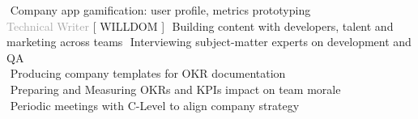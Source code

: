 \begin{cvtable}
{     \textperiodcentered $ $ Company app gamification: user profile, metrics prototyping
     \\
} 
% 
% 
{\textcolor{darkgray}{%
    Technical Writer
    }}%
{[ {W\scriptsize ILL}{D\scriptsize OM} ]}%
{%
    \textperiodcentered $ $ Building content with developers, talent and marketing across teams 
    \textperiodcentered $ $ Interviewing subject-matter experts on development and QA \\
    \textperiodcentered $ $ Producing company templates for OKR documentation \\
    \textperiodcentered $ $ Preparing and Measuring OKRs and KPIs impact on team morale \\
    \textperiodcentered $ $ Periodic meetings with C-Level to align company strategy  \\
} 


\end{cvtable}
